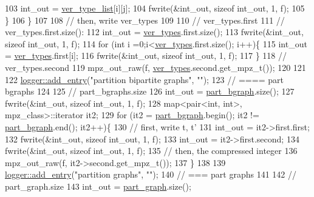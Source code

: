 \begin{DoxyCode}
103       int\_out = \hyperlink{classmarked__graph__compressed_af2e3e55223d436628a02758dfae88493}{ver\_type\_list}[i][j];
104       fwrite(&int\_out, \textcolor{keyword}{sizeof} int\_out, 1, f);
105     \}
106   \}
107 
108   \textcolor{comment}{// then, write ver\_types}
109 
110   \textcolor{comment}{// ver\_types.first}
111   \textcolor{comment}{// ver\_types.first.size():}
112   int\_out = \hyperlink{classmarked__graph__compressed_af446cc5e23c241a92b76642fd5ebc403}{ver\_types}.first.size();
113   fwrite(&int\_out, \textcolor{keyword}{sizeof} int\_out, 1, f);
114   \textcolor{keywordflow}{for} (\textcolor{keywordtype}{int} i =0;i<\hyperlink{classmarked__graph__compressed_af446cc5e23c241a92b76642fd5ebc403}{ver\_types}.first.size(); i++)\{
115     int\_out = \hyperlink{classmarked__graph__compressed_af446cc5e23c241a92b76642fd5ebc403}{ver\_types}.first[i];
116     fwrite(&int\_out, \textcolor{keyword}{sizeof} int\_out, 1, f);
117   \}
118   \textcolor{comment}{// ver\_types.second}
119   mpz\_out\_raw(f, \hyperlink{classmarked__graph__compressed_af446cc5e23c241a92b76642fd5ebc403}{ver\_types}.second.get\_mpz\_t());
120 
121 
122   \hyperlink{classlogger_a710163deb17bc81f70d53d285b8ac9ac}{logger::add\_entry}(\textcolor{stringliteral}{"partition bipartite graphs"}, \textcolor{stringliteral}{""});
123   \textcolor{comment}{// ==== part bgraphs}
124 
125   \textcolor{comment}{// part\_bgraphs.size}
126   int\_out = \hyperlink{classmarked__graph__compressed_a7b3267063fba30b45eb21b3ba4e07536}{part\_bgraph}.size();
127   fwrite(&int\_out, \textcolor{keyword}{sizeof} int\_out, 1, f);
128   map<pair<int, int>, mpz\_class>::iterator it2;
129   \textcolor{keywordflow}{for} (it2 = \hyperlink{classmarked__graph__compressed_a7b3267063fba30b45eb21b3ba4e07536}{part\_bgraph}.begin(); it2 != \hyperlink{classmarked__graph__compressed_a7b3267063fba30b45eb21b3ba4e07536}{part\_bgraph}.end(); it2++)\{
130     \textcolor{comment}{// first, write t, t'}
131     int\_out = it2->first.first;
132     fwrite(&int\_out, \textcolor{keyword}{sizeof} int\_out, 1, f);
133     int\_out = it2->first.second;
134     fwrite(&int\_out, \textcolor{keyword}{sizeof} int\_out, 1, f);
135     \textcolor{comment}{// then, the compressed integer}
136     mpz\_out\_raw(f, it2->second.get\_mpz\_t());
137   \}
138 
139   \hyperlink{classlogger_a710163deb17bc81f70d53d285b8ac9ac}{logger::add\_entry}(\textcolor{stringliteral}{"partition graphs"}, \textcolor{stringliteral}{""});
140   \textcolor{comment}{// === part graphs}
141 
142   \textcolor{comment}{// part\_graph.size}
143   int\_out = \hyperlink{classmarked__graph__compressed_ae179a4737e6eab905c18a94d44ef64b7}{part\_graph}.size();

\end{DoxyCode}
